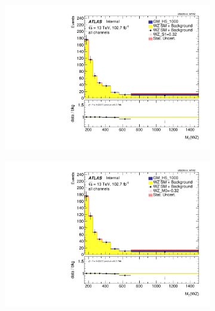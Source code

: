 \documentclass[../Bachelorarbeit.tex]{subfiles}
\begin{document}
\begin{figure}[h]

    \centering
    \begin{subfigure}{0.45\textwidth}
        \includegraphics[width=\textwidth]{Plots/ALL_MTWZ_right_color/GM_H5_1000/S1/2022-05-07/VBSSR/all_VV_MTWZ.pdf}
    \end{subfigure}
    \begin{subfigure}{0.45\textwidth}
        \includegraphics[width=\textwidth]{Plots/ALL_MTWZ_right_color/GM_H5_1000/M0/2022-05-07/VBSSR/all_VV_MTWZ.pdf}
    \end{subfigure}
    \begin{subfigure}{0.45\textwidth}

\end{subfigure}
\end{figure}
\end{document}
